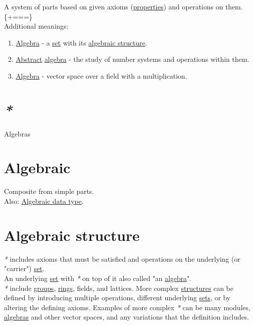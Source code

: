 \documentclass[a4paper,14pt,oneside]{book}
\begin{document}
A system of parts based on given axioms (\hyperref[org8f0d66e]{properties}) and operations on them.\\


\{\footnotesize +===\}\\

Additional meanings:\\

\begin{enumerate}
\item \hyperref[org58fccae]{Algebra} - a \hyperref[org7053c53]{set} with its \hyperref[orgb2aba25]{algebraic structure}.\\
\item \hyperref[org0652869]{Abstract} \hyperref[org58fccae]{algebra} - the study of number systems and operations within them.\\
\item \hyperref[org58fccae]{Algebra} - vector space over a field with a multiplication.\\
\end{enumerate}

\section{\emph{*}}
\label{sec:org70a99d9}

\label{org3c007e1}Algebras\\

\section{\label{org1d88005}Algebraic}
\label{sec:org4b9123a}
Composite from simple parts.\\

Also: \hyperref[org09e3f72]{Algebraic data type}.\\

\section{\label{orgb2aba25}Algebraic structure}
\label{sec:org7227781}
\emph{*} includes axioms that must be satisfied and operations on the underlying (or "carrier") \hyperref[org7053c53]{set}.\\

An underlying \hyperref[org7053c53]{set} with \emph{*} on top of it also called "an \hyperref[org58fccae]{algebra}".\\

\emph{*} include \hyperref[org7896727]{groups}, \hyperref[orgf49c26f]{rings}, fields, and lattices. More complex \hyperref[org999abe3]{structures} can be defined by introducing multiple operations, different underlying \hyperref[org88e5adc]{sets}, or by altering the defining axioms. Examples of more complex \emph{*} can be many modules, \hyperref[org3c007e1]{algebras} and other vector spaces, and any variations that the definition includes.\\
\end{document}
